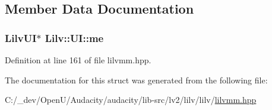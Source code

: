 \subsection{Member Data Documentation}
\subsubsection[{\texorpdfstring{me}{me}}]{ {\bf Lilv\+UI}$\ast$ Lilv\+::\+U\+I\+::me}\hypertarget{struct_lilv_1_1_u_i_aa241948607de29d51eb87182b88d646f}{}\label{struct_lilv_1_1_u_i_aa241948607de29d51eb87182b88d646f}


Definition at line 161 of file lilvmm.\+hpp.



The documentation for this struct was generated from the following file\+:\begin{DoxyCompactItemize}
\item 
C\+:/\+\_\+dev/\+Open\+U/\+Audacity/audacity/lib-\/src/lv2/lilv/lilv/\hyperlink{lilvmm_8hpp}{lilvmm.\+hpp}\end{DoxyCompactItemize}
